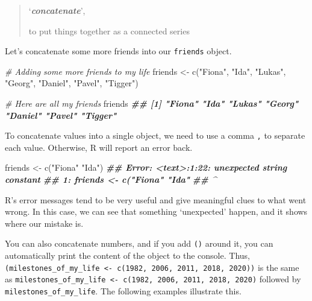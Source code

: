 \documentclass[
]{book}
\newenvironment{Shaded}{\begin{snugshade}}{\end{snugshade}}
\newcommand{\CommentTok}[1]{\textcolor[rgb]{0.56,0.35,0.01}{\textit{#1}}}
\newcommand{\DocumentationTok}[1]{\textcolor[rgb]{0.56,0.35,0.01}{\textbf{\textit{#1}}}}
\newcommand{\FunctionTok}[1]{\textcolor[rgb]{0.00,0.00,0.00}{#1}}
\newcommand{\NormalTok}[1]{#1}
\newcommand{\OtherTok}[1]{\textcolor[rgb]{0.56,0.35,0.01}{#1}}
\newcommand{\StringTok}[1]{\textcolor[rgb]{0.31,0.60,0.02}{#1}}
\begin{document}
\begin{quote}
`\textbf{\emph{concatenate}}',

to put things together as a connected series
\end{quote}

Let's concatenate some more friends into our \texttt{friends} object.

\begin{Shaded}
\begin{Highlighting}[]
\CommentTok{\# Adding some more friends to my life}
\NormalTok{friends }\OtherTok{\textless{}{-}} \FunctionTok{c}\NormalTok{(}\StringTok{"Fiona"}\NormalTok{, }\StringTok{"Ida"}\NormalTok{, }\StringTok{"Lukas"}\NormalTok{, }\StringTok{"Georg"}\NormalTok{, }\StringTok{"Daniel"}\NormalTok{, }\StringTok{"Pavel"}\NormalTok{, }\StringTok{"Tigger"}\NormalTok{)}

\CommentTok{\# Here are all my friends}
\NormalTok{friends}
\DocumentationTok{\#\# [1] "Fiona"  "Ida"    "Lukas"  "Georg"  "Daniel" "Pavel"  "Tigger"}
\end{Highlighting}
\end{Shaded}

To concatenate values into a single object, we need to use a comma \texttt{,} to separate each value. Otherwise, R will report an error back.

\begin{Shaded}
\begin{Highlighting}[]
\NormalTok{friends }\OtherTok{\textless{}{-}} \FunctionTok{c}\NormalTok{(}\StringTok{"Fiona"} \StringTok{"Ida"}\NormalTok{)}
\DocumentationTok{\#\# Error: \textless{}text\textgreater{}:1:22: unexpected string constant}
\DocumentationTok{\#\# 1: friends \textless{}{-} c("Fiona" "Ida"}
\DocumentationTok{\#\#                          \^{}}
\end{Highlighting}
\end{Shaded}

R's error messages tend to be very useful and give meaningful clues to what went wrong. In this case, we can see that something `unexpected' happen, and it shows where our mistake is.

You can also concatenate numbers, and if you add \texttt{()} around it, you can automatically print the content of the object to the console. Thus, \texttt{(milestones\_of\_my\_life\ \textless{}-\ c(1982,\ 2006,\ 2011,\ 2018,\ 2020))} is the same as \texttt{milestones\_of\_my\_life\ \textless{}-\ c(1982,\ 2006,\ 2011,\ 2018,\ 2020)} followed by \texttt{milestones\_of\_my\_life}. The following examples illustrate this.
\end{document}
